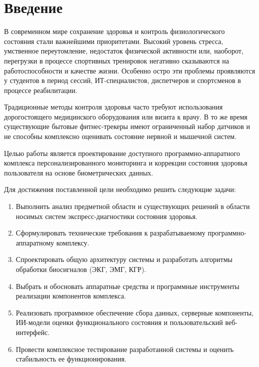 \documentclass[utf8, russian]{eskdtext}
\begin{document}

\maketitle
\tableofcontents

\newpage

\section*{Введение}

В современном мире сохранение здоровья и контроль физиологического состояния стали важнейшими приоритетами. Высокий уровень стресса, умственное переутомление, недостаток физической активности или, наоборот, перегрузки в процессе спортивных тренировок негативно сказываются на работоспособности и качестве жизни. Особенно остро эти проблемы проявляются у студентов в период сессий, ИТ-специалистов, диспетчеров и спортсменов в процессе реабилитации.

Традиционные методы контроля здоровья часто требуют использования дорогостоящего медицинского оборудования или визита к врачу. В то же время существующие бытовые фитнес-трекеры имеют ограниченный набор датчиков и не способны комплексно оценивать состояние нервной и мышечной систем.

Целью работы является проектирование доступного программно-аппаратного комплекса персонализированного мониторинга и коррекции состояния здоровья пользователя на основе биометрических данных.

Для достижения поставленной цели необходимо решить следующие задачи:
\begin{enumerate}
    \item Выполнить анализ предметной области и существующих решений в области носимых систем экспресс-диагностики состояния здоровья.
    \item Сформулировать технические требования к разрабатываемому программно-аппаратному комплексу.
    \item Спроектировать общую архитектуру системы и разработать алгоритмы обработки биосигналов (ЭКГ, ЭМГ, КГР).
    \item Выбрать и обосновать аппаратные средства и программные инструменты реализации компонентов комплекса.
    \item Реализовать программное обеспечение сбора данных, серверные компоненты, ИИ-модели оценки функционального состояния и пользовательский веб-интерфейс.
    \item Провести комплексное тестирование разработанной системы и оценить стабильность ее функционирования.
\end{enumerate}
\end{document}
